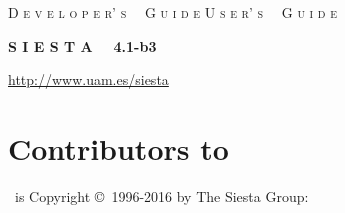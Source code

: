 


\date{November 29, 2016}




\begin{titlepage}

\begin{center}

\vspace{1cm}
\ifdeveloper
 {\Huge \textsc{D e v e l o p e r' s \, \, G u i d e}}
\else
 {\Huge \textsc{U s e r' s \, \, G u i d e}}
\fi

\vspace{1cm}
\hrulefill
\vspace{1cm}

{\Huge \textbf{S I E S T A \, \, 4.1-b3}}

\vspace{1cm}
\hrulefill
\vspace{0.5cm}

{\Large \printdate}

\vspace{1.5cm}
{\Large \url{http://www.uam.es/siesta}}

\end{center}

\end{titlepage}


\newpage


\section*{Contributors to \siesta}

\siesta\ is Copyright \copyright\  1996-2016 by The Siesta Group:
\vspace{0.5cm}

